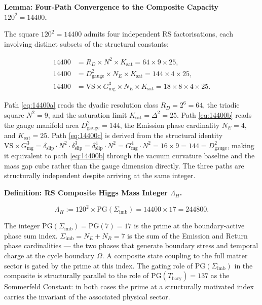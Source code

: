 \documentclass[11pt, letterpaper]{article}
\theoremstyle{definition}
\theoremstyle{plain}
\begin{document}
\begin{rsbox}
\textbf{Lemma: Four-Path Convergence to the Composite Capacity $120^2 = 14400$.}

The square $120^2 = 14400$ admits four independent RS factorisations, each involving
distinct subsets of the structural constants:

\begin{align}
    14400 &= R_D \times N^2 \times K_\mathrm{sat}
             = 64 \times 9 \times 25, \label{eq:14400a}\\
    14400 &= D_\mathrm{gauge}^2 \times N_E \times K_\mathrm{sat}
             = 144 \times 4 \times 25, \label{eq:14400b}\\
    14400 &= \mathrm{VS} \times G_\mathrm{mg}^3 \times N_E \times K_\mathrm{sat}
             = 18 \times 8 \times 4 \times 25. \label{eq:14400c}
\end{align}

Path \eqref{eq:14400a} reads the dyadic resolution class $R_D = 2^6 = 64$, the triadic
square $N^2 = 9$, and the saturation limit $K_\mathrm{sat} = \Delta^2 = 25$.
Path \eqref{eq:14400b} reads the gauge manifold area $D_\mathrm{gauge}^2 = 144$, the
Emission phase cardinality $N_E = 4$, and $K_\mathrm{sat} = 25$.
Path \eqref{eq:14400c} is derived from the structural identity
$\mathrm{VS} \times G_\mathrm{mg}^3 = \delta_\mathrm{slip} \cdot N^2 \cdot \delta_\mathrm{slip}^3
= \delta_\mathrm{slip}^4 \cdot N^2 = G_\mathrm{mg}^4 \cdot N^2 = 16 \times 9 = 144
= D_\mathrm{gauge}^2$, making it equivalent to path \eqref{eq:14400b} through the vacuum
curvature baseline and the mass gap cube rather than the gauge dimension directly.
The three paths are structurally independent despite arriving at the same integer.
\end{rsbox}

\begin{rsbox}
\textbf{Definition: RS Composite Higgs Mass Integer $\Lambda_H$.}

\begin{equation}
    \Lambda_H := 120^2 \times \mathrm{PG}(\Sigma_\mathrm{imb})
               = 14400 \times 17 = 244800.
\end{equation}

The integer $\mathrm{PG}(\Sigma_\mathrm{imb}) = \mathrm{PG}(7) = 17$ is the prime at the
boundary-active phase sum index. $\Sigma_\mathrm{imb} = N_E + N_R = 7$ is the sum of the
Emission and Return phase cardinalities — the two phases that generate boundary stress
and temporal charge at the cycle boundary $\Omega$. A composite state coupling to the full
matter sector is gated by the prime at this index. The gating role of $\mathrm{PG}(\Sigma_\mathrm{imb})$
in the composite is structurally parallel to the role of $\mathrm{PG}(T_\mathrm{bary}) = 137$
as the Sommerfeld Constant: in both cases the prime at a structurally motivated index
carries the invariant of the associated physical sector.
\end{rsbox}
\end{document}
